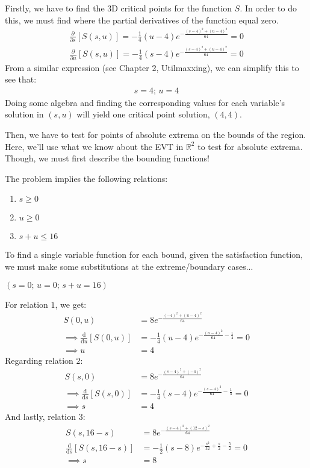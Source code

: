 Firstly, we have to find the $3$D critical points for the function $S$.
In order to do this, we must find where the partial derivatives of the function equal zero.
\begin{align*}
	\frac{\partial}{\partial s}[S(s, u)] = -\frac{1}{4}(u-4)e^{-\frac{(s-4)^2+(u-4)^2}{64}}=0\\
	\frac{\partial}{\partial u}[S(s, u)] = -\frac{1}{4}(s-4)e^{-\frac{(s-4)^2+(u-4)^2}{64}}=0
\end{align*}
From a similar expression (see Chapter 2, Utilmaxxing), we can simplify this to see that:
\begin{align*}
	s = 4\text{; }u = 4
\end{align*}
Doing some algebra and finding the corresponding values for each variable's solution in $(s, u)$ will yield one critical point solution, $(4, 4)$.

Then, we have to test for points of absolute extrema on the bounds of the region.
Here, we'll use what we know about the EVT in $\mathbb{R}^2$ to test for absolute extrema.
Though, we must first describe the bounding functions!

The problem implies the following relations:
\begin{enumerate}
	\item $s\geq 0$
	\item $u\geq 0$
	\item $s+u\leq 16$
\end{enumerate}

To find a single variable function for each bound, given the satisfaction function, we must make some substitutions at the extreme/boundary cases...
\begin{center}
	$(s=0\text{; }u=0\text{; }s+u=16)$
\end{center}
For relation $1$, we get:
\begin{align*}
	S(0, u)&=8e^{-\frac{(-4)^2+(u-4)^2}{64}}\\
	\implies \frac{\mathrm{d}}{\mathrm{d}u}[S(0,u)]&=-\frac{1}{4}(u-4)e^{-\frac{(u-4)^2}{64}-\frac{1}{4}}=0\\
	\implies u&=4
\end{align*}
Regarding relation $2$:
\begin{align*}
	S(s, 0)&=8e^{-\frac{(s-4)^2+(-4)^2}{64}}\\
	\implies \frac{\mathrm{d}}{\mathrm{d}s}[S(s,0)]&=-\frac{1}{4}(s-4)e^{-\frac{(s-4)^2}{64}-\frac{1}{4}}=0\\
	\implies s&=4
\end{align*}
And lastly, relation $3$:
\begin{align*}
	S(s, 16-s)&=8e^{-\frac{(s-4)^2+(12-s)^2}{64}}\\
	\frac{\mathrm{d}}{\mathrm{d}s}[S(s,16-s)]&=-\frac{1}{2}(s-8)e^{-\frac{s^2}{32}+\frac{s}{2}-\frac{5}{2}}=0\\
	\implies s&=8
\end{align*}

